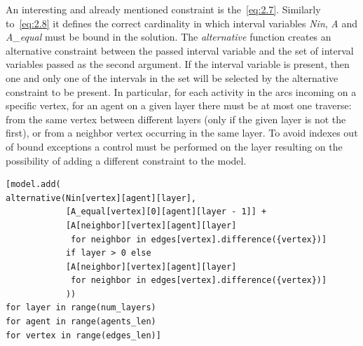 \documentclass[12pt, a4paper, hidelinks]{article}
\numberwithin{equation}{section}
\begin{document}
An interesting and already mentioned constraint is the~\ref{eq:2.7}.
Similarly to~\ref{eq:2.8} it defines the correct cardinality in which interval variables \textit{Nin}, \textit{A} and \textit{A\_equal} must be bound in the solution.
The \textit{alternative} function creates an alternative constraint between the passed interval variable and the set of interval variables passed as the second argument.
If the interval variable is present, then one and only one of the intervals in the set will be selected by the alternative constraint to be present.
In particular, for each activity in the arcs incoming on a specific vertex, for an agent on a given layer there must be at most one traverse: from the same vertex between different layers (only if the given layer is not the first), or from a neighbor vertex occurring in the same layer.
To avoid indexes out of bound exceptions a control must be performed on the layer resulting on the possibility of adding a different constraint to the model.

\begin{lstlisting}[label={lst:eq2.7}]
[model.add(
alternative(Nin[vertex][agent][layer],
            [A_equal[vertex][0][agent][layer - 1]] +
            [A[neighbor][vertex][agent][layer]
             for neighbor in edges[vertex].difference({vertex})]
            if layer > 0 else
            [A[neighbor][vertex][agent][layer]
             for neighbor in edges[vertex].difference({vertex})]
            ))
for layer in range(num_layers)
for agent in range(agents_len)
for vertex in range(edges_len)]
\end{lstlisting}
\end{document}
